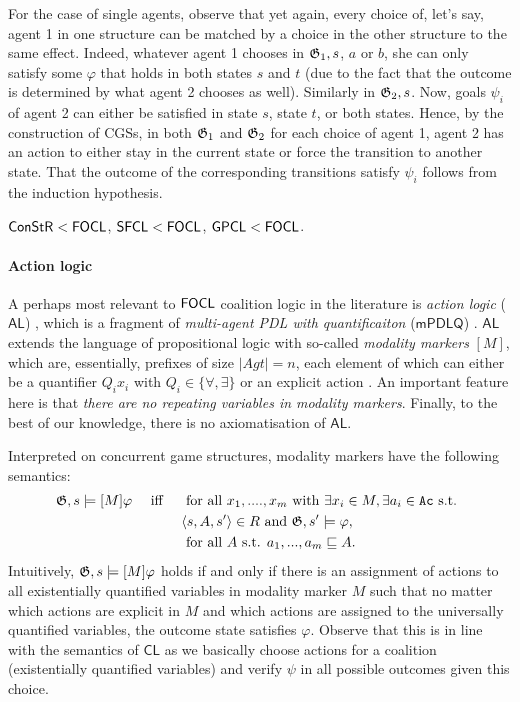 \documentclass[sigconf,anonymous]{aamas}
\begin{document}
For the case of single agents, observe that yet again, every choice of, let's say, agent 1 in one structure can be matched by a choice in the other structure to the same effect. Indeed, whatever agent 1 chooses in $\mathfrak{G}_1, s$, $a$ or $b$, she can only satisfy some $\varphi$ that holds in both states $s$ and $t$ (due to the fact that the outcome is determined by what agent 2 chooses as well). Similarly in $\mathfrak{G}_2, s$. Now, goals $\psi_i$ of agent 2 can either be satisfied in state $s$, state $t$, or both states. Hence, by the construction of CGSs, in both $\mathfrak{G}_1$ and $\mathfrak{G}_2$ for each choice of agent 1, agent 2 has an action to either stay in the current state or force the transition to another state. That the outcome of the corresponding transitions satisfy $\psi_i$ follows from the induction hypothesis. 

\begin{proposition}
    $\mathsf{ConStR} < \mathsf{FOCL}$, $\mathsf{SFCL} < \mathsf{FOCL}$, $\mathsf{GPCL} < \mathsf{FOCL}$.
\end{proposition}

\paragraph{Action logic} 

A perhaps most relevant to $\mathsf{FOCL}$ coalition logic in the literature is \textit{action logic} ($\mathsf{AL}$) \cite{borgo07}, which is a fragment of \textit{multi-agent PDL with quantificaiton} ($\mathsf{mPDLQ}$) \cite{borgo05}. $\mathsf{AL}$ extends the language of propositional logic with so-called \textit{modality markers} $[M]$, which are, essentially, prefixes of size $|Agt| = n$, each element of which can either be a quantifier $Q_i x_i$ with $Q_i \in \{\forall, \exists\}$ or an explicit action \cite{borgo05,borgo05b}. An important feature here is that \textit{there are no repeating variables in modality markers}. Finally, to the best of our knowledge, there is no axiomatisation of  $\mathsf{AL}$.

Interpreted on concurrent game structures, modality markers have the following semantics:
  \begin{alignat*}{3}
        &\mathfrak{G},s \models [M] \varphi && \text{ iff } && \text{ for all } x_1, ...., x_m \text{ with } \exists x_i \in M, \exists a_i \in \texttt{Ac} \text{ s.t. }\\
        & && &&\langle s, A, s'\rangle \in R \text{ and } \mathfrak{G},s'\models \varphi,\\ & && &&\text{ for all } A \text{ s.t. } a_1, ..., a_m \sqsubseteq A.  
\end{alignat*}    
Intuitively, $\mathfrak{G},s \models [M] \varphi$ holds if and only if there is an assignment of actions to all existentially quantified variables in modality marker $M$ such that no matter which actions are explicit in $M$ and which actions are assigned to the universally quantified variables, the outcome state satisfies $\varphi$. Observe that this is in line with the semantics of $\mathsf{CL}$ as we basically choose actions for a coalition (existentially quantified variables) and verify $\psi$ in all possible outcomes given this choice. 
\end{document}
